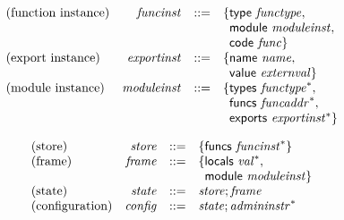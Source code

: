 \documentclass{article}
\begin{document}
\vspace{1ex}

\vspace{1ex}

$$
\begin{array}{@{}lrrl@{}l@{}}
	\mbox{(function instance)} & {\mathit{funcinst}} &::=& \{ \begin{array}[t]{@{}l@{}l@{}}
		\mathsf{type}~{\mathit{functype}},\; \\
		\mathsf{module}~{\mathit{moduleinst}},\; \\
		\mathsf{code}~{\mathit{func}} \}\end{array} \\
	\mbox{(export instance)} & {\mathit{exportinst}} &::=& \{ \begin{array}[t]{@{}l@{}l@{}}
		\mathsf{name}~{\mathit{name}},\; \\
		\mathsf{value}~{\mathit{externval}} \}\end{array} \\
	\mbox{(module instance)} & {\mathit{moduleinst}} &::=& \{ \begin{array}[t]{@{}l@{}l@{}}
		\mathsf{types}~{{\mathit{functype}}^\ast},\; \\
		\mathsf{funcs}~{{\mathit{funcaddr}}^\ast},\; \\
		\mathsf{exports}~{{\mathit{exportinst}}^\ast} \}\end{array} \\
\end{array}
$$

\vspace{1ex}

$$
\begin{array}{@{}lrrl@{}l@{}}
	\mbox{(store)} & {\mathit{store}} &::=& \{ \begin{array}[t]{@{}l@{}l@{}}
		\mathsf{funcs}~{{\mathit{funcinst}}^\ast} \}\end{array} \\
	\mbox{(frame)} & {\mathit{frame}} &::=& \{ \begin{array}[t]{@{}l@{}l@{}}
		\mathsf{locals}~{{\mathit{val}}^\ast},\; \\
		\mathsf{module}~{\mathit{moduleinst}} \}\end{array} \\
	\mbox{(state)} & {\mathit{state}} &::=& {\mathit{store}} ; {\mathit{frame}} \\
	\mbox{(configuration)} & {\mathit{config}} &::=& {\mathit{state}} ; {{\mathit{admininstr}}^\ast} \\
\end{array}
$$
\end{document}
